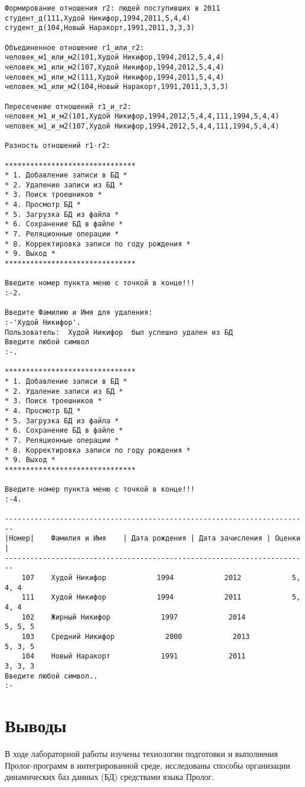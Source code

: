 \documentclass[a4paper,14pt]{extarticle}
\begin{document}
\begin{lstlisting}
Формирование отношения r2: людей поступивших в 2011 
студент_д(111,Худой Никифор,1994,2011,5,4,4)
студент_д(104,Новый Наракорт,1991,2011,3,3,3)

Объединенное отношение r1_или_r2: 
человек_м1_или_м2(101,Худой Никифор,1994,2012,5,4,4)
человек_м1_или_м2(107,Худой Никифор,1994,2012,5,4,4)
человек_м1_или_м2(111,Худой Никифор,1994,2011,5,4,4)
человек_м1_или_м2(104,Новый Наракорт,1991,2011,3,3,3)

Пересечение отношений r1_и_r2: 
человек_м1_и_м2(101,Худой Никифор,1994,2012,5,4,4,111,1994,5,4,4)
человек_м1_и_м2(107,Худой Никифор,1994,2012,5,4,4,111,1994,5,4,4)

Разность отношений r1-r2: 

*******************************
* 1. Добавление записи в БД *
* 2. Удаление записи из БД *
* 3. Поиск троешников *
* 4. Просмотр БД *
* 5. Загрузка БД из файла *
* 6. Сохранение БД в файле *
* 7. Реляционные операции *
* 8. Корректировка записи по году рождения *
* 9. Выход *
*******************************

Введите номер пункта меню с точкой в конце!!!
:-2.

Введите Фамилию и Имя для удаления:
:-'Худой Никифор'.
Пользователь:  Худой Никифор  был успешно удален из БД
Введите любой символ
:-.

*******************************
* 1. Добавление записи в БД *
* 2. Удаление записи из БД *
* 3. Поиск троешников *
* 4. Просмотр БД *
* 5. Загрузка БД из файла *
* 6. Сохранение БД в файле *
* 7. Реляционные операции *
* 8. Корректировка записи по году рождения *
* 9. Выход *
*******************************

Введите номер пункта меню с точкой в конце!!!
:-4.

------------------------------------------------------------------------
|Номер|    Фамилия и Имя    | Дата рождения | Дата зачисления | Оценки |
------------------------------------------------------------------------
    107    Худой Никифор            1994            2012            5, 4, 4
    111    Худой Никифор            1994            2011            5, 4, 4
    102    Жирный Никифор            1997            2014            5, 5, 5
    103    Средний Никифор            2000            2013            5, 3, 5
    104    Новый Наракорт            1991            2011            3, 3, 3
Введите любой символ..
:-
\end{lstlisting}

\section*{Выводы}
В ходе лабораторной работы изучены технологии подготовки и выполнения
Пролог-программ в интегрированной среде, исследованы способы организации
динамических баз данных (БД) средствами языка Пролог.
\end{document}
